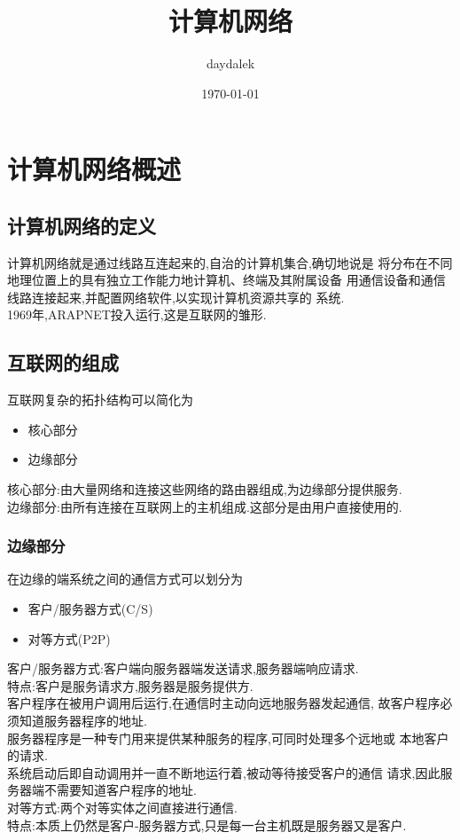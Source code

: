 \documentclass{ctexart}
\begin{document}
\title{计算机网络}
\author{daydalek}
\date{\today}
\maketitle
\section{计算机网络概述}
\subsection{计算机网络的定义}
计算机网络就是通过线路互连起来的,自治的计算机集合,确切地说是
将分布在不同地理位置上的具有独立工作能力地计算机、终端及其附属设备
用通信设备和通信线路连接起来,并配置网络软件,以实现计算机资源共享的
系统.\\
1969年,ARAPNET投入运行,这是互联网的雏形.
\subsection{互联网的组成}
互联网复杂的拓扑结构可以简化为\\
\begin{itemize}
	\item 核心部分
	\item 边缘部分
\end{itemize}
核心部分:由大量网络和连接这些网络的路由器组成,为边缘部分提供服务.\\
边缘部分:由所有连接在互联网上的主机组成.这部分是由用户直接使用的.\\
\subsubsection{边缘部分}
在边缘的端系统之间的通信方式可以划分为
\begin{itemize}
	\item 客户/服务器方式(C/S)
	\item 对等方式(P2P)
\end{itemize}
客户/服务器方式:客户端向服务器端发送请求,服务器端响应请求.\\
特点:客户是服务请求方,服务器是服务提供方.\\
客户程序在被用户调用后运行,在通信时主动向远地服务器发起通信,
故客户程序必须知道服务器程序的地址.\\
服务器程序是一种专门用来提供某种服务的程序,可同时处理多个远地或
本地客户的请求.\\
系统启动后即自动调用并一直不断地运行着,被动等待接受客户的通信
请求,因此服务器端不需要知道客户程序的地址.\\
对等方式:两个对等实体之间直接进行通信.\\
特点:本质上仍然是客户-服务器方式,只是每一台主机既是服务器又是客户.\\
\end{document}
